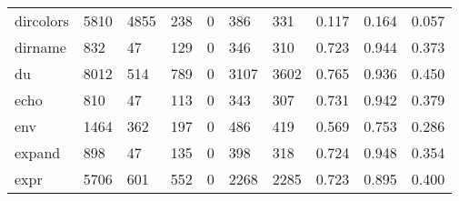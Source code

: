 \begin{longtable}{lp{2.0cm}p{2.0cm}p{2.0cm}p{2.0cm}p{2.0cm}p{2.0cm}p{2.0cm}p{2.0cm}p{2.0cm}}
dircolors &                   5810 &                               4855 &                               238 &                                0 &                               386 &                             331 &                                   0.117 &                                  0.164 &                                0.057 \\
dirname   &                    832 &                                 47 &                               129 &                                0 &                               346 &                             310 &                                   0.723 &                                  0.944 &                                0.373 \\
du        &                   8012 &                                514 &                               789 &                                0 &                              3107 &                            3602 &                                   0.765 &                                  0.936 &                                0.450 \\
echo      &                    810 &                                 47 &                               113 &                                0 &                               343 &                             307 &                                   0.731 &                                  0.942 &                                0.379 \\
env       &                   1464 &                                362 &                               197 &                                0 &                               486 &                             419 &                                   0.569 &                                  0.753 &                                0.286 \\
expand    &                    898 &                                 47 &                               135 &                                0 &                               398 &                             318 &                                   0.724 &                                  0.948 &                                0.354 \\
expr      &                   5706 &                                601 &                               552 &                                0 &                              2268 &                            2285 &                                   0.723 &                                  0.895 &                                0.400 \\

\end{longtable}

